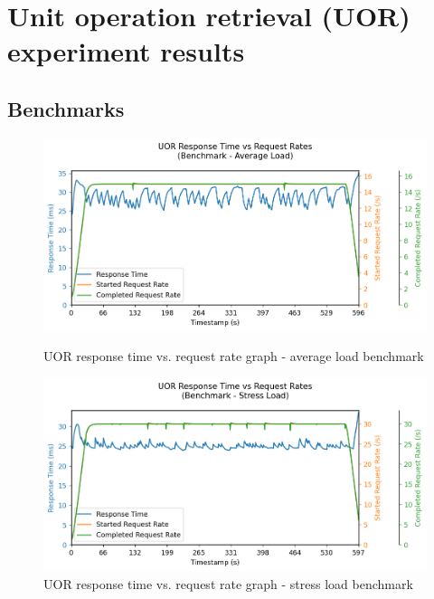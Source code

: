 \section{Unit operation retrieval (UOR) experiment results}

\subsection{Benchmarks}

\begin{figure}[h]
    \centering
    \begin{minipage}{.47\textwidth}
        \centering
        \includegraphics[width=\linewidth]{figures/uor-benchmark-average.png}
        \caption{UOR response time vs. request rate graph - average load benchmark}
        \label{figure:uor-benchmark-average}
    \end{minipage}%
    \hspace{0.05\textwidth} %
    \begin{minipage}{.47\textwidth}
        \centering
        \includegraphics[width=\linewidth]{figures/uor-benchmark-stress.png}
        \caption{UOR response time vs. request rate graph - stress load benchmark}
        \label{figure:uor-benchmark-stress}
    \end{minipage}
\end{figure}

